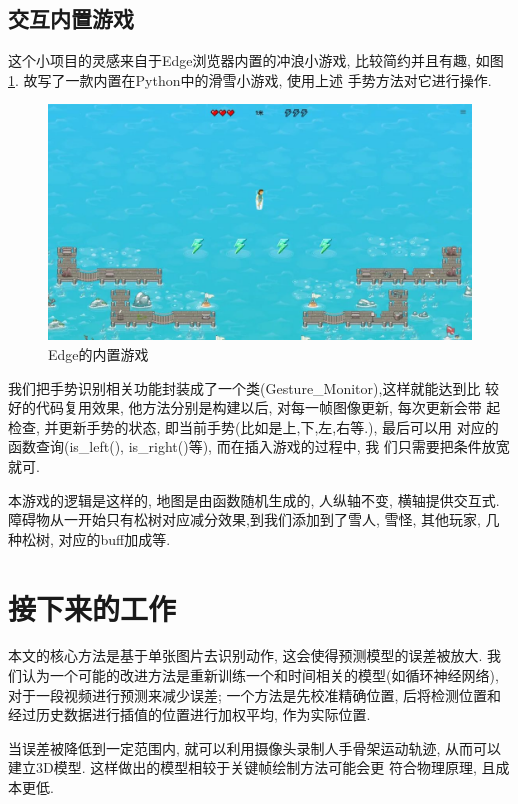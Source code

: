 \documentclass[lang=cn,11pt,a4paper]{elegantpaper}
\begin{document}
\subsection{交互内置游戏}

这个小项目的灵感来自于Edge浏览器内置的冲浪小游戏, 
比较简约并且有趣, 如图\ref{edge}. 故写了一款内置在Python中的滑雪小游戏, 使用上述
手势方法对它进行操作. 
\begin{figure}[htb]
  \centering
  \includegraphics[width=.8\textwidth]{imgs/edge.jpeg}
  \caption{Edge的内置游戏\label{edge}}
\end{figure}

我们把手势识别相关功能封装成了一个类(Gesture\_Monitor),这样就能达到比
较好的代码复用效果, 他方法分别是构建以后, 对每一帧图像更新, 每次更新会带
起检查, 并更新手势的状态, 即当前手势(比如是上,下,左,右等.), 最后可以用
对应的函数查询(is\_left(), is\_right()等), 而在插入游戏的过程中, 我
们只需要把条件放宽就可.
 
本游戏的逻辑是这样的, 地图是由函数随机生成的, 人纵轴不变, 横轴提供交互式. 
障碍物从一开始只有松树对应减分效果,到我们添加到了雪人, 雪怪, 其他玩家, 
几种松树, 对应的buff加成等. 

\section{接下来的工作}

本文的核心方法是基于单张图片去识别动作, 这会使得预测模型的误差被放大. 
我们认为一个可能的改进方法是重新训练一个和时间相关的模型(如循环神经网络), 
对于一段视频进行预测来减少误差; 一个方法是先校准精确位置, 后将检测位置和
经过历史数据进行插值的位置进行加权平均, 作为实际位置. 

当误差被降低到一定范围内, 就可以利用摄像头录制人手骨架运动轨迹, 
从而可以建立3D模型. 这样做出的模型相较于关键帧绘制方法可能会更
符合物理原理, 且成本更低. 
\end{document}
